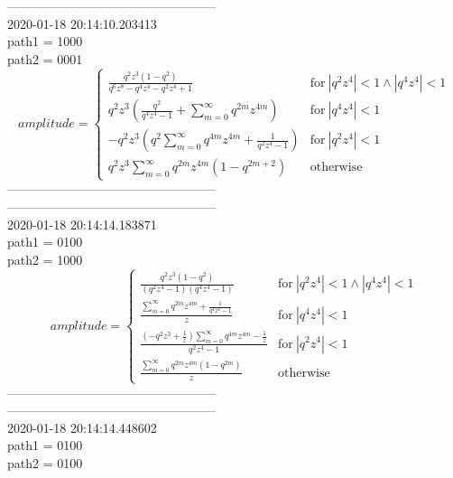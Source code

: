 \documentclass{jsreport}
\begin{document}
--------------------------------------------------\\
2020-01-18 20:14:10.203413\\
path1 = 1000\\
path2 = 0001\\
$$amplitude = \begin{cases} \frac{q^{2} z^{3} \left(1 - q^{2}\right)}{q^{6} z^{8} - q^{4} z^{4} - q^{2} z^{4} + 1} & \text{for}\: \left|{q^{2} z^{4}}\right| < 1 \wedge \left|{q^{4} z^{4}}\right| < 1 \\q^{2} z^{3} \left(\frac{q^{2}}{q^{4} z^{4} - 1} + \sum_{m=0}^{\infty} q^{2 m} z^{4 m}\right) & \text{for}\: \left|{q^{4} z^{4}}\right| < 1 \\- q^{2} z^{3} \left(q^{2} \sum_{m=0}^{\infty} q^{4 m} z^{4 m} + \frac{1}{q^{2} z^{4} - 1}\right) & \text{for}\: \left|{q^{2} z^{4}}\right| < 1 \\q^{2} z^{3} \sum_{m=0}^{\infty} q^{2 m} z^{4 m} \left(1 - q^{2 m + 2}\right) & \text{otherwise} \end{cases}$$
--------------------------------------------------\\
--------------------------------------------------\\
2020-01-18 20:14:14.183871\\
path1 = 0100\\
path2 = 1000\\
$$amplitude = \begin{cases} \frac{q^{2} z^{3} \left(1 - q^{2}\right)}{\left(q^{2} z^{4} - 1\right) \left(q^{4} z^{4} - 1\right)} & \text{for}\: \left|{q^{2} z^{4}}\right| < 1 \wedge \left|{q^{4} z^{4}}\right| < 1 \\\frac{\sum_{m=0}^{\infty} q^{2 m} z^{4 m} + \frac{1}{q^{4} z^{4} - 1}}{z} & \text{for}\: \left|{q^{4} z^{4}}\right| < 1 \\\frac{\left(- q^{2} z^{3} + \frac{1}{z}\right) \sum_{m=0}^{\infty} q^{4 m} z^{4 m} - \frac{1}{z}}{q^{2} z^{4} - 1} & \text{for}\: \left|{q^{2} z^{4}}\right| < 1 \\\frac{\sum_{m=0}^{\infty} q^{2 m} z^{4 m} \left(1 - q^{2 m}\right)}{z} & \text{otherwise} \end{cases}$$
--------------------------------------------------\\
--------------------------------------------------\\
2020-01-18 20:14:14.448602\\
path1 = 0100\\
path2 = 0100\\
\end{document}

